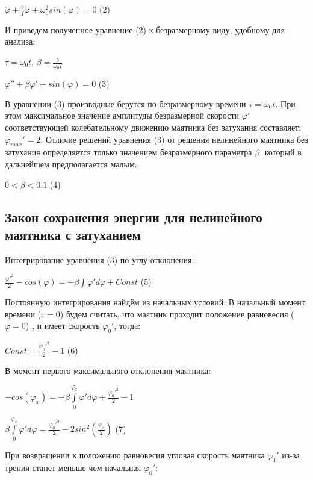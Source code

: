 \documentclass[a4paper]{article}
\begin{document}
\begin{center}$\ddot{\varphi}+\frac{b}{I}\dot{\varphi}+\omega_0^2 sin(\varphi) =0$ (2)\end{center}
И приведем полученное уравнение (2) к безразмерному виду, удобному для анализа:
\begin{center}$\tau=\omega_0t$, $\beta=\frac{b}{\omega_0I}$\end{center}

\begin{center}$\varphi''+\beta\varphi'+sin(\varphi)=0$ (3)\end{center}
В уравнении (3) производные берутся по безразмерному времени $\tau = \omega_0t$. При этом максимальное значение амплитуды безразмерной скорости $\varphi'$ соответствующей колебательному движению маятника без затухания составляет:  $\varphi_{max}'=2$. Отличие решений уравнения (3) от решения нелинейного маятника без затухания определяется только значением безразмерного параметра $\beta$, который в дальнейшем предполагается малым:
\begin{center}$0<\beta<0.1$ (4)\end{center}

\subsection{Закон сохранения энергии для нелинейного маятника с затуханием}
Интегрирование уравнения (3) по углу отклонения:
\begin{center}$\frac{\varphi'^2}{2}-cos(\varphi)=-\beta\int\varphi'd\varphi + Const$ (5)\end{center}
Постоянную интегрирования найдём из начальных условий. В начальный момент времени ($\tau=0$) будем считать, что маятник проходит
положение равновесия ($\varphi=0$) , и имеет скорость $\varphi_0'$, тогда:
\begin{center}$Const = \frac{\varphi_0'^2}{2}-1$ (6)\end{center}
В момент первого максимального отклонения маятника:
\begin{center}$-cos(\varphi_x) = -\beta\int\limits_{0}^{\varphi_x}\varphi'd\varphi + \frac{\varphi_0'^2}{2} -1$\end{center}

\begin{center}$\beta\int\limits_{0}^{\varphi_x}\varphi'd\varphi = \frac{\varphi_0'^2}{2} - 2sin^2(\frac{\varphi_x}{2})$ (7)\end{center}
При возвращении к положению равновесия угловая скорость маятника $\varphi_1'$ из-за трения станет меньше чем начальная $\varphi_0'$:
\end{document}
